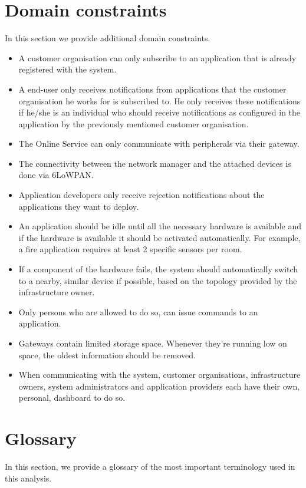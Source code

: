 \documentclass[english]{sareport}
\begin{document}
\section{Domain constraints}
In this section we provide additional domain constraints.

\begin{itemize}
    \item A customer organisation can only subscribe to an application that is already registered with the system.
    \item A end-user only receives notifications from applications that the customer organisation he works for is subscribed to. He only receives these notifications if he/she is an individual who should receive notifications as configured in the application by the previously mentioned customer organisation.
    \item The Online Service can only communicate with peripherals via their gateway.
    \item The connectivity between the network manager and the attached devices is done via 6LoWPAN.
    \item Application developers only receive rejection notifications about the applications they want to deploy.
    \item An application should be idle until all the necessary hardware is available and if the hardware is available it should be activated automatically. For example, a fire application requires at least 2 specific sensors per room.
    \item If a component of the hardware fails, the system should automatically switch to a nearby, similar device if possible, based on the topology provided by the infrastructure owner.
    \item Only persons who are allowed to do so, can issue commands to an application.
    \item Gateways contain limited storage space. Whenever they're running low on space, the oldest information should be removed.
    \item When communicating with the system, customer organisations, infrastructure owners, system administrators and application providers each have their own, personal, dashboard to do so.
\end{itemize}

\section{Glossary}
In this section, we provide a glossary of the most important terminology used
in this analysis.
\end{document}
